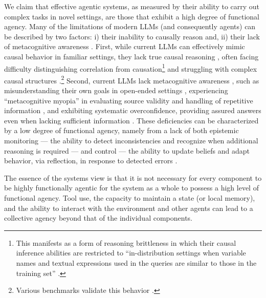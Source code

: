 \documentclass{article}
\theoremstyle{plain}
\theoremstyle{definition}
\theoremstyle{remark}
\begin{document}
We claim that effective agentic systems, as measured by their ability to carry out complex tasks in novel settings, are those that exhibit a high degree of functional agency. Many of the limitations of modern LLMs (and consequently agents) can be described by two factors: i) their inability to causally reason \cite{zevcevic2023causal,jin2023can,romanou2023crab} and, ii) their lack of metacognitive awareness \cite{johnson2024imagining,griot2025large}. First, while current LLMs can effectively mimic causal behavior in familiar settings, they lack true causal reasoning \cite{zevcevic2023causal}, often facing difficulty distinguishing correlation from causation\footnote{This manifests as a form of reasoning brittleness in which their causal inference abilities are restricted to ``in-distribution settings when variable names and textual expressions used in the queries are similar to those in the training set'' \cite{jin2023can}.} and struggling with complex causal structures \cite{romanou2023crab}.\footnote{Various benchmarks validate this behavior \cite{kapkicc2024introducing,zhou2024causalbench,yang2024critical}.} Second, current LLMs lack metacognitive awareness \cite{johnson2024imagining}, such as misunderstanding their own goals in open-ended settings \cite{li2024think}, experiencing ``metacognitive myopia'' in evaluating source validity and handling of repetitive information \cite{scholten2024metacognitive}, and exhibiting systematic overconfidence, providing assured answers even when lacking sufficient information \cite{griot2025large}. These deficiencies can be characterized by a low degree of functional agency, namely from a lack of both epistemic monitoring --- the ability to detect inconsistencies and recognize when additional reasoning is required --- and control --- the ability to update beliefs and adapt behavior, via reflection, in response to detected errors \cite{nelson1996consciousness,thompson2011intuition,ackerman2017meta,scholten2024metacognitive}. 


The essence of the systems view is that it is not necessary for every component to be highly functionally agentic for the system as a whole to possess a high level of functional agency. Tool use, the capacity to maintain a state (or local memory), and the ability to interact with the environment and other agents can lead to a collective agency beyond that of the individual components. 







\end{document}
